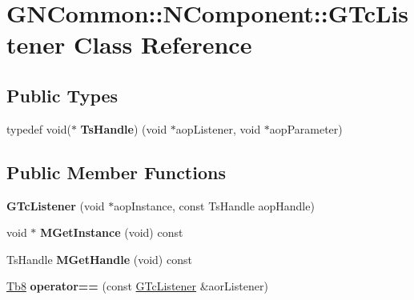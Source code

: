 \hypertarget{class_g_n_common_1_1_n_component_1_1_g_tc_listener}{}\section{G\+N\+Common\+:\+:N\+Component\+:\+:G\+Tc\+Listener Class Reference}
\label{class_g_n_common_1_1_n_component_1_1_g_tc_listener}
\subsection*{Public Types}
\begin{DoxyCompactItemize}
\item 
\mbox{\label{class_g_n_common_1_1_n_component_1_1_g_tc_listener_a99a90bed304780bf96facc284bc6a3c8}} 
typedef void($\ast$ {\bfseries Ts\+Handle}) (void $\ast$aop\+Listener, void $\ast$aop\+Parameter)
\end{DoxyCompactItemize}
\subsection*{Public Member Functions}
\begin{DoxyCompactItemize}
\item 
\mbox{\label{class_g_n_common_1_1_n_component_1_1_g_tc_listener_aefc63ad4c7dc623de5c9c156848774ce}} 
{\bfseries G\+Tc\+Listener} (void $\ast$aop\+Instance, const Ts\+Handle aop\+Handle)
\item 
\mbox{\label{class_g_n_common_1_1_n_component_1_1_g_tc_listener_aa7b293fa2d8fb08c31b9953557ead0c8}} 
void $\ast$ {\bfseries M\+Get\+Instance} (void) const
\item 
\mbox{\label{class_g_n_common_1_1_n_component_1_1_g_tc_listener_a401b10e5fb60ecb19c6808ba5f758674}} 
Ts\+Handle {\bfseries M\+Get\+Handle} (void) const
\item 
\mbox{\label{class_g_n_common_1_1_n_component_1_1_g_tc_listener_a4ae45f5ca3166a6cef67177b22ee478a}} 
\mbox{\hyperlink{namespace_g_n_common_a8115dc7ed53b6e5b52e6bfde1632ea74}{Tb8}} {\bfseries operator==} (const \mbox{\hyperlink{class_g_n_common_1_1_n_component_1_1_g_tc_listener}{G\+Tc\+Listener}} \&aor\+Listener)
\end{DoxyCompactItemize}
